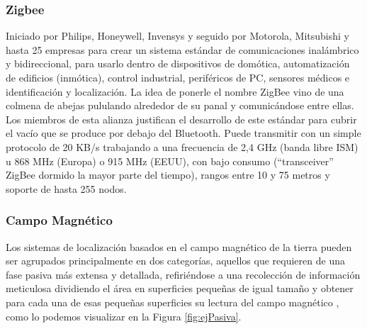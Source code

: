 \subsubsection{Zigbee}

Iniciado por Philips, Honeywell, Invensys y seguido por Motorola, Mitsubishi y hasta 25 empresas para crear un sistema estándar de comunicaciones inalámbrico y bidireccional, para usarlo dentro de dispositivos de domótica, automatización de edificios (inmótica), control industrial, periféricos de PC, sensores médicos e identificación y localización. La idea de ponerle el nombre ZigBee vino de una colmena de abejas pululando alrededor de su panal y comunicándose entre ellas.
Los miembros de esta alianza justifican el desarrollo de este estándar para cubrir el vacío que se produce por debajo del Bluetooth. Puede transmitir con un simple protocolo de 20 KB/s trabajando a una frecuencia de 2,4 GHz (banda libre ISM) u 868 MHz (Europa) o 915 MHz (EEUU), con bajo consumo (“transceiver” ZigBee dormido la mayor parte del tiempo), rangos entre 10 y 75 metros y soporte de hasta 255 nodos. 

\subsubsection{Campo Magnético}

Los sistemas de localización basados en el campo magnético de la tierra pueden ser agrupados principalmente en dos categorías, aquellos que requieren de una fase pasiva más extensa y detallada, refiriéndose a una recolección de información meticulosa dividiendo el área en superficies pequeñas de igual tamaño y obtener para cada una de esas pequeñas superficies su lectura del campo magnético \cite{usoCampoMagnetico}, como lo podemos visualizar en la Figura \ref{fig:ejPasiva}.

